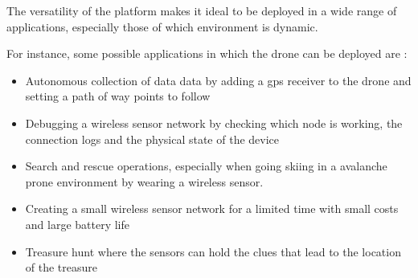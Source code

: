 \label{chap:future}

The versatility of the platform makes it ideal to be deployed in a wide range of applications, especially those of which environment is dynamic.

For instance, some possible applications in which the drone can be deployed are  \cite{arampatzis2005survey}:

 \begin{itemize} 

\item  Autonomous collection of data data by adding a gps receiver to the drone and setting a path of way points to follow

\item Debugging a wireless sensor network by checking which node is working, the connection logs and the physical state of the device

\item Search and rescue operations, especially when going skiing in a avalanche prone environment by wearing a wireless sensor. 

\item Creating a small wireless sensor network for a limited time with small costs and large battery life

\item Treasure hunt where the sensors can hold the clues that lead to the location of the treasure

 
\end{itemize}

